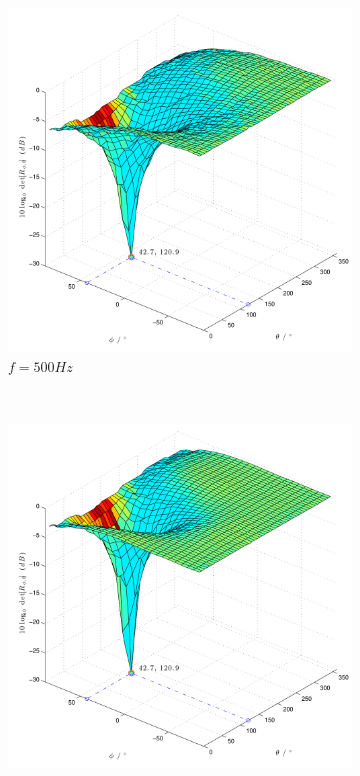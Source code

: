 \begin{figure}
\begin{subfigure}[b]{0.48\textwidth}
                \includegraphics[width=\textwidth]{grafiken/02_Konzeptionierung/Sim_sine_f_500_Phi_45_Theta_120_dB_SNR_100dB}
                \caption{$f=500Hz$}
                \label{fig:Sim_sine_f_500_Phi_45_Theta_120_dB_SNR_100dB}
        \end{subfigure}
        ~ %
        \begin{subfigure}[b]{0.48\textwidth}
                \centering
                \includegraphics[width=\textwidth]{grafiken/02_Konzeptionierung/Sim_sine_f_1000_Phi_45_Theta_120_dB_SNR_100dB}

\end{subfigure}
\end{figure}
